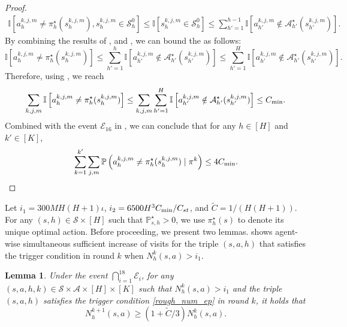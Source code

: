 \documentclass{article}
\newtheorem{lemma}{Lemma}[section]
\newcommand{\sah}{\mathcal{S} \times \mathcal{A} \times [H]}
\begin{document}
\begin{proof}
    \begin{align}
    \label{notequal2}
        \mathbb{I}\left[a_h^{k,j,m} \neq \pi_h^{\star}(s_h^{k,j,m}), s_h^{k,j,m} \in \mathcal{S}_h^0\right] \leq \mathbb{I}\left[s_h^{k,j,m} \in \mathcal{S}_h^0\right] \leq \sum_{h'=1}^{h-1} \mathbb{I}\left[a_{h'}^{k,j,m} \notin \mathcal{A}_{h'}^{\star}(s_{h'}^{k,j,m})\right].
    \end{align}
    By combining the results of ,  and , we can bound the  as follows:
    $$\mathbb{I}\left[a_h^{k,j,m} \neq \pi_h^{\star}(s_h^{k,j,m})\right] \leq \sum_{h'=1}^{h} \mathbb{I}\left[a_{h'}^{k,j,m} \notin \mathcal{A}_{h'}^{\star}(s_{h'}^{k,j,m})\right] \leq \sum_{h'=1}^{H} \mathbb{I}\left[a_{h'}^{k,j,m} \notin \mathcal{A}_{h'}^{\star}(s_{h'}^{k,j,m})\right].$$
    Therefore, using , we reach
    $$\sum_{k,j,m}\mathbb{I}\left[a_h^{k,j,m} \neq \pi_h^{\star}(s_h^{k,j,m})\right]  \leq \sum_{k,j,m}\sum_{h'=1}^{H} \mathbb{I}\left[a_{h'}^{k,j,m} \notin \mathcal{A}_{h'}^{\star}(s_{h'}^{k,j,m})\right] \leq C_{\textnormal{min}}.$$
    Combined with the event $\mathcal{E}_{16}$ in , we can conclude that for any $h\in[H]$ and  $k' \in [K]$,
\begin{align*}
        \sum_{k = 1}^{k'} \sum_{j,m}\mathbb{P}\left(a_h^{k,j,m} \neq \pi_h^{\star}(s_h^{k,j,m}) \mid \pi^k\right) \leq 4C_{\textnormal{min}}.
\end{align*}
\end{proof}
Let \( i_1 = 300 MH(H+1) \iota \), $i_2 = 6500H^3C_{\textnormal{min}}/C_{st}$, and $\tilde{C} = 1/(H(H+1))$. For any $(s,h)\in\mathcal{S}\times [H]$ such that $\mathbb{P}_{s,h}^{\star} > 0$, we use $\pi_h^\star(s)$ to denote its unique optimal action. Before proceeding, we present two lemmas.  shows agent-wise simultaneous sufficient increase of visits for the triple \( (s, a, h) \) that satisfies the trigger condition in round \( k \) when $N_h^k(s, a) > i_1$.
\begin{lemma}
    \label{1smallN}
    Under the event $\bigcap_{i=1}^{18}\mathcal{E}_i$, for any  \( (s, a, h,k) \in \sah \times[K] \) such that \( N_h^k(s, a) > i_1 \) and the triple $(s,a,h)$ satisfies the trigger condition \eqref{rough_num_ep} in round \( k \), it holds that
    $$N_h^{k+1}(s,a) \geq (1 + \tilde{C}/3)N_h^k(s,a).$$
\end{lemma}
\end{document}
